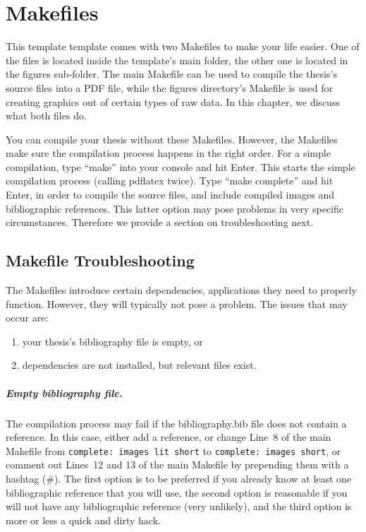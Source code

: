 \chapter{Makefiles}
\label{ch:makefiles}

This \acs{template} template comes with two Makefiles to make your life easier.
One of the files is located inside the template's main folder, the other one is
located in the figures sub-folder.
The main Makefile can be used to compile the thesis's source files into a PDF
file, while the figures directory's Makefile is used for creating graphics out
of certain types of raw data.
In this chapter, we discuss what both files do.

You can compile your thesis without these Makefiles.
However, the Makefiles make sure the compilation process happens in the right
order.
For a simple compilation, type ``make'' into your console and hit Enter.
This starts the simple compilation process (calling pdflatex twice).
Type ``make complete'' and hit Enter, in order to compile the source files,
and include compiled images and bibliographic references.
This latter option may pose problems in very specific circumstances.
Therefore we provide a section on troubleshooting next.



\section{Makefile Troubleshooting}
\label{sec:makefiles:trouble}
The Makefiles introduce certain dependencies, \ie{} applications they need to
properly function.
However, they will typically not pose a problem.
The issues that may occur are:
\begin{enumerate}
	\item your thesis's bibliography file is empty, or
	\item dependencies are not installed, but relevant files exist.
\end{enumerate}

\paragraph{Empty bibliography file.}
The compilation process may fail if the \mbox{bibliography.bib} file does not
contain a reference. In this case, either add a reference, or change Line~8 of
the main Makefile from  \verb+complete: images lit short+ to 
\verb+complete: images short+, or comment out Lines~12 and 13 of the main
Makefile by prepending them with a hashtag (\#).
The first option is to be preferred if you already know at least one
bibliographic reference that you will use, the second option is reasonable if
you will not have any bibliographic reference (very unlikely), and the third
option is more or less a quick and dirty hack.

